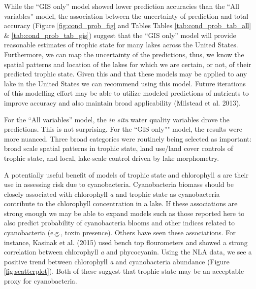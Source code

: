 \documentclass[12pt,]{article}
\begin{document}
While the ``GIS only'' model showed lower prediction accuracies than the
``All variables'' model, the association between the uncertainty of
prediction and total accuracy (Figure \ref{fig:cond_prob_fig} and Tables
Tables \ref{tab:cond_prob_tab_all} \& \ref{tab:cond_prob_tab_gis})
suggest that the ``GIS only'' model will provide reasonable estimates of
trophic state for many lakes across the United States. Furthermore, we
can map the uncertainty of the predictions, thus, we know the spatial
patterns and location of the lakes for which we are certain, or not, of
their predicted trophic state. Given this and that these models may be
applied to any lake in the United States we can recommend using this
model. Future iterations of this modelling effort may be able to utilize
modeled predictions of nutrients to improve accuracy and also maintain
broad applicability (Milstead et al. 2013).

For the ``All variables'' model, the \emph{in situ} water quality
variables drove the predictions. This is not surprising. For the ``GIS
only''" model, the results were more nuanced. Three broad categories
were routinely being selected as important: broad scale spatial patterns
in trophic state, land use/land cover controls of trophic state, and
local, lake-scale control driven by lake morphometry.

A potentially useful benefit of models of trophic state and chlorophyll
\emph{a} are their use in assessing risk due to cyanobacteria.
Cyanobacteria biomass should be closely associated with chlorophyll
\emph{a} and trophic state as cyanobacteria contribute to the
chlorophyll concentration in a lake. If these associations are strong
enough we may be able to expand models such as those reported here to
also predict probability of cyanobacteria blooms and other indices
related to cyanobacteria (e.g., toxin presence). Others have seen these
associations. For instance, Kasinak et al. (2015) used bench top
flourometers and showed a strong correlation between chlorophyll
\emph{a} and phycocyanin. Using the NLA data, we see a positive trend
between chlorophyll \emph{a} and cyanobacteria abundance (Figure
\ref{fig:scatterplot}). Both of these suggest that trophic state may be
an acceptable proxy for cyanobacteria.
\end{document}
